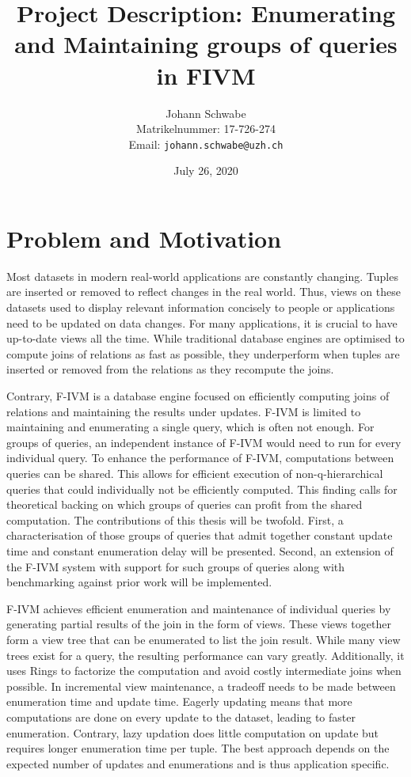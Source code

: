\documentclass[abstracton,12pt]{scrreprt}
\title{Project Description: Enumerating and Maintaining groups of queries in FIVM}
\author{
	Johann Schwabe\\[-5pt]
	\scriptsize Matrikelnummer: 17-726-274\\[-5pt]
	\scriptsize Email: \texttt{johann.schwabe@uzh.ch}
}
\date{\vspace*{2cm}July 26, 2020}
\begin{document}
\maketitle



\chapter{Problem and Motivation}
Most datasets in modern real-world applications are constantly changing. Tuples are inserted or removed to reflect changes in the real world. Thus, views on these datasets used to display relevant information concisely to people or applications need to be updated on data changes. For many applications, it is crucial to have up-to-date views all the time. While traditional database engines are optimised to compute joins of relations as fast as possible, they underperform when tuples are inserted or removed from the relations as they recompute the joins. 

Contrary, F-IVM is a database engine focused on efficiently computing joins of relations and maintaining the results under updates. F-IVM is limited to maintaining and enumerating a single query, which is often not enough. For groups of queries, an independent instance of F-IVM would need to run for every individual query. To enhance the performance of F-IVM, computations between queries can be shared. This allows for efficient execution of non-q-hierarchical queries that could individually not be efficiently computed. This finding calls for theoretical backing on which groups of queries can profit from the shared computation. The contributions of this thesis will be twofold. First, a characterisation of those groups of queries that admit together constant update time and constant enumeration delay will be presented. Second, an extension of the F-IVM system with support for such groups of queries along with benchmarking against prior work will be implemented.

 F-IVM achieves efficient enumeration and maintenance of individual queries by generating partial results of the join in the form of views. These views together form a view tree that can be enumerated to list the join result. While many view trees exist for a query, the resulting performance can vary greatly. Additionally, it uses Rings to factorize the computation and avoid costly intermediate joins when possible. In incremental view maintenance, a tradeoff needs to be made between enumeration time and update time. Eagerly updating means that more computations are done on every update to the dataset, leading to faster enumeration. Contrary, lazy updation does little computation on update but requires longer enumeration time per tuple. The best approach depends on the expected number of updates and enumerations and is thus application specific. 
 
\end{document}
